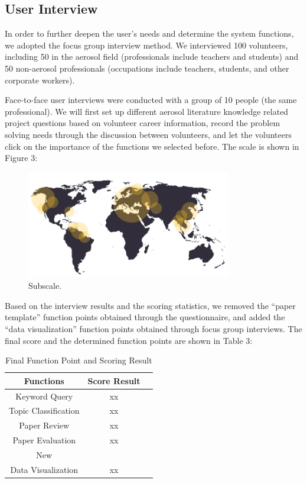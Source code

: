 \subsection{User Interview}
In order to further deepen the user's needs and determine the system functions, we adopted the focus group interview method. We interviewed 100 volunteers, including 50 in the aerosol field (professionals include teachers and students) and 50 non-aerosol professionals (occupations include teachers, students, and other corporate workers). 

Face-to-face user interviews were conducted with a group of 10 people (the same professional). We will first set up different aerosol literature knowledge related project questions based on volunteer career information, record the problem solving needs through the discussion between volunteers, and let the volunteers click on the importance of the functions we selected before. The scale is shown in Figure 3:

\begin{figure}
	\includegraphics[width=0.8\textwidth]{pic1.pdf}
	\caption{Subscale.}
\end{figure}

Based on the interview results and the scoring statistics, we removed the “paper template” function points obtained through the questionnaire, and added the “data visualization” function points obtained through focus group interviews. The final score and the determined function points are shown in Table 3:

\begin{table}
	\caption{Final Function Point and Scoring Result}
	\label{tab:freq}
	\begin{tabular}{ccl}
		\toprule
		Functions&Score Result\\
		\midrule
		Keyword Query & xx\\
		Topic Classification & xx\\
		Paper Review & xx\\
		Paper Evaluation & xx\\
		\midrule
		New\\
		Data Visualization & xx\\
		\bottomrule
	\end{tabular}
\end{table}


